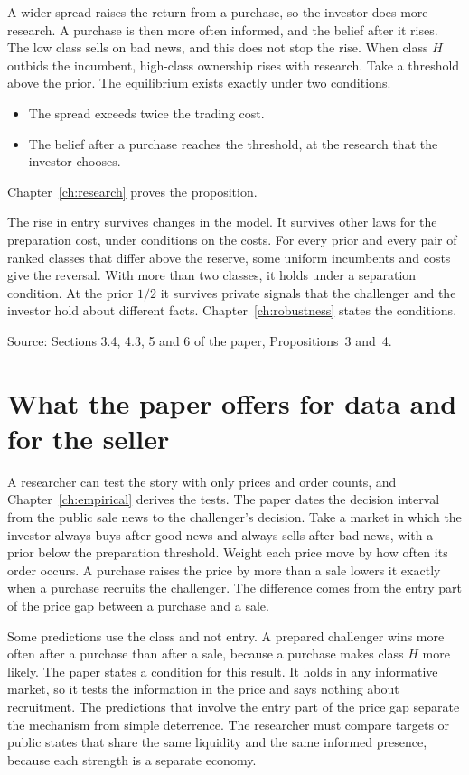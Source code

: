 A wider spread raises the return from a purchase, so the investor does more research. A purchase is then more often informed, and the belief after it rises. The low class sells on bad news, and this does not stop the rise. When class \(H\) outbids the incumbent, high-class ownership rises with research. Take a threshold above the prior. The equilibrium exists exactly under two conditions.
\begin{itemize}
\item The spread exceeds twice the trading cost.
\item The belief after a purchase reaches the threshold, at the research that the investor chooses.
\end{itemize}
Chapter~\ref{ch:research} proves the proposition.

The rise in entry survives changes in the model. It survives other laws for the preparation cost, under conditions on the costs. For every prior and every pair of ranked classes that differ above the reserve, some uniform incumbents and costs give the reversal. With more than two classes, it holds under a separation condition. At the prior \(1/2\) it survives private signals that the challenger and the investor hold about different facts. Chapter~\ref{ch:robustness} states the conditions.

{\small\color{notegrey}Source: Sections 3.4, 4.3, 5 and 6 of the paper, Propositions~3 and~4.}

\section{What the paper offers for data and for the seller}\label{sec:story-uses}

A researcher can test the story with only prices and order counts, and Chapter~\ref{ch:empirical} derives the tests. The paper dates the decision interval from the public sale news to the challenger's decision. Take a market in which the investor always buys after good news and always sells after bad news, with a prior below the preparation threshold. Weight each price move by how often its order occurs. A purchase raises the price by more than a sale lowers it exactly when a purchase recruits the challenger. The difference comes from the entry part of the price gap between a purchase and a sale.

Some predictions use the class and not entry. A prepared challenger wins more often after a purchase than after a sale, because a purchase makes class \(H\) more likely. The paper states a condition for this result. It holds in any informative market, so it tests the information in the price and says nothing about recruitment. The predictions that involve the entry part of the price gap separate the mechanism from simple deterrence. The researcher must compare targets or public states that share the same liquidity and the same informed presence, because each strength is a separate economy.

